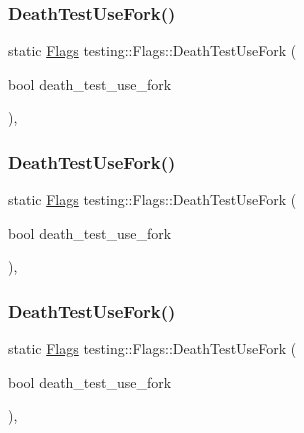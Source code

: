 \mbox{\label{structtesting_1_1_flags_a4468e5625833043596c44be174349d8c}} 
\subsubsection{\texorpdfstring{DeathTestUseFork()}{DeathTestUseFork()}\hspace{0.1cm}{\footnotesize\ttfamily [1/3]}}
{\footnotesize\ttfamily static \mbox{\hyperlink{structtesting_1_1_flags}{Flags}} testing\+::\+Flags\+::\+Death\+Test\+Use\+Fork (\begin{DoxyParamCaption}\item[{bool}]{death\+\_\+test\+\_\+use\+\_\+fork }\end{DoxyParamCaption})\hspace{0.3cm}{\ttfamily [inline]}, {\ttfamily [static]}}

\mbox{\label{structtesting_1_1_flags_a4468e5625833043596c44be174349d8c}} 
\subsubsection{\texorpdfstring{DeathTestUseFork()}{DeathTestUseFork()}\hspace{0.1cm}{\footnotesize\ttfamily [2/3]}}
{\footnotesize\ttfamily static \mbox{\hyperlink{structtesting_1_1_flags}{Flags}} testing\+::\+Flags\+::\+Death\+Test\+Use\+Fork (\begin{DoxyParamCaption}\item[{bool}]{death\+\_\+test\+\_\+use\+\_\+fork }\end{DoxyParamCaption})\hspace{0.3cm}{\ttfamily [inline]}, {\ttfamily [static]}}

\mbox{\label{structtesting_1_1_flags_a4468e5625833043596c44be174349d8c}} 
\subsubsection{\texorpdfstring{DeathTestUseFork()}{DeathTestUseFork()}\hspace{0.1cm}{\footnotesize\ttfamily [3/3]}}
{\footnotesize\ttfamily static \mbox{\hyperlink{structtesting_1_1_flags}{Flags}} testing\+::\+Flags\+::\+Death\+Test\+Use\+Fork (\begin{DoxyParamCaption}\item[{bool}]{death\+\_\+test\+\_\+use\+\_\+fork }\end{DoxyParamCaption})\hspace{0.3cm}{\ttfamily [inline]}, {\ttfamily [static]}}

